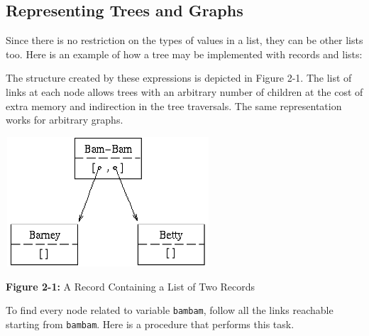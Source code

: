 \subsection{Representing Trees and Graphs}

Since there is no restriction on the types of values in a list, they can
be other lists too. Here is an example of how a tree may be implemented
with records and lists:


The structure created by these expressions is depicted in Figure 2-1.
The list of links at each node allows trees with an arbitrary number of
children at the cost of extra memory and indirection in the tree
traversals. The same representation works for arbitrary
graphs.



\begin{center}
\includegraphics[width=3in,height=1.9in]{ub-img/ub-img6.png}
\end{center}

{\sffamily\bfseries Figure 2-1:}
{\sffamily A Record Containing a List of Two Records}

\bigskip

To find every node related to variable \texttt{bambam}, follow all the
links reachable starting from \texttt{bambam}. Here is a procedure that
performs this task.



